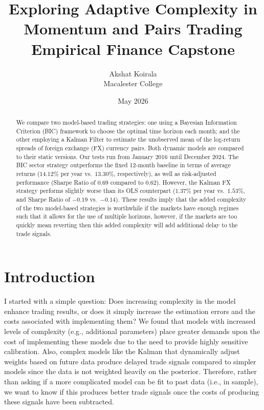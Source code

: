 \documentclass[12pt]{article}
\title{\textbf{Exploring Adaptive Complexity in Momentum and Pairs Trading}\\[0.4em]
\large Empirical Finance Capstone}
\author{Akshat Koirala\\Macalester College}
\date{May 2026}
\begin{document}
\maketitle

\begin{abstract}
We compare two model-based trading strategies: one using a Bayesian Information Criterion (BIC) framework to choose the optimal time horizon each month; and the other employing a Kalman Filter to estimate the unobserved mean of the log-return spreads of foreign exchange (FX) currency pairs. Both dynamic models are compared to their static versions. Our tests run from January 2016 until December 2024. The BIC sector strategy outperforms the fixed 12-month baseline in terms of average returns ($14.12\%$ per year vs.\ $13.30\%$, respectively), as well as risk-adjusted performance (Sharpe Ratio of $0.69$ compared to $0.62$). However, the Kalman FX strategy performs slightly worse than its OLS counterpart ($1.37\%$ per year vs.\ $1.53\%$, and Sharpe Ratio of $-0.19$ vs.\ $-0.14$). These results imply that the added complexity of the two model-based strategies is worthwhile if the markets have enough regimes such that it allows for the use of multiple horizons, however, if the markets are too quickly mean reverting then this added complexity will add additional delay to the trade signals.
\end{abstract}

\newpage

\begingroup
\singlespacing
\small
\setlength{\parskip}{0pt}
\tableofcontents
\endgroup

\newpage
\onehalfspacing

\section{Introduction}

I started with a simple question: Does increasing complexity in the model enhance trading results, or does it simply increase the estimation errors and the costs associated with implementing them? We found that models with increased levels of complexity (e.g., additional parameters) place greater demands upon the cost of implementing these models due to the need to provide highly sensitive calibration. Also, complex models like the Kalman that dynamically adjust weights based on future data produce delayed trade signals compared to simpler models since the data is not weighted heavily on the posterior. Therefore, rather than asking if a more complicated model can be fit to past data (i.e., in sample), we want to know if this produces better trade signals once the costs of producing these signals have been subtracted.
\end{document}
